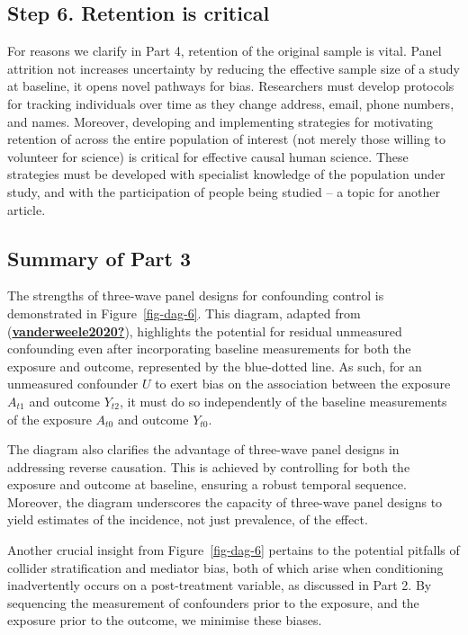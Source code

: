 \documentclass[
  singlecolumn]{report}
\begin{document}
\hypertarget{step-6.-retention-is-critical}{%
\subsection{Step 6. Retention is
critical}\label{step-6.-retention-is-critical}}

For reasons we clarify in Part 4, retention of the original sample is
vital. Panel attrition not increases uncertainty by reducing the
effective sample size of a study at baseline, it opens novel pathways
for bias. Researchers must develop protocols for tracking individuals
over time as they change address, email, phone numbers, and names.
Moreover, developing and implementing strategies for motivating
retention of across the entire population of interest (not merely those
willing to volunteer for science) is critical for effective causal human
science. These strategies must be developed with specialist knowledge of
the population under study, and with the participation of people being
studied -- a topic for another article.

\hypertarget{summary-of-part-3}{%
\subsection{Summary of Part 3}\label{summary-of-part-3}}

The strengths of three-wave panel designs for confounding control is
demonstrated in Figure~\ref{fig-dag-6}. This diagram, adapted from
(\protect\hyperlink{ref-vanderweele2020}{\textbf{vanderweele2020?}}),
highlights the potential for residual unmeasured confounding even after
incorporating baseline measurements for both the exposure and outcome,
represented by the blue-dotted line. As such, for an unmeasured
confounder \(U\) to exert bias on the association between the exposure
\(A_{t1}\) and outcome \(Y_{t2}\), it must do so independently of the
baseline measurements of the exposure \(A_{t0}\) and outcome \(Y_{t0}\).

The diagram also clarifies the advantage of three-wave panel designs in
addressing reverse causation. This is achieved by controlling for both
the exposure and outcome at baseline, ensuring a robust temporal
sequence. Moreover, the diagram underscores the capacity of three-wave
panel designs to yield estimates of the incidence, not just prevalence,
of the effect.

Another crucial insight from Figure~\ref{fig-dag-6} pertains to the
potential pitfalls of collider stratification and mediator bias, both of
which arise when conditioning inadvertently occurs on a post-treatment
variable, as discussed in Part 2. By sequencing the measurement of
confounders prior to the exposure, and the exposure prior to the
outcome, we minimise these biases.
\end{document}
